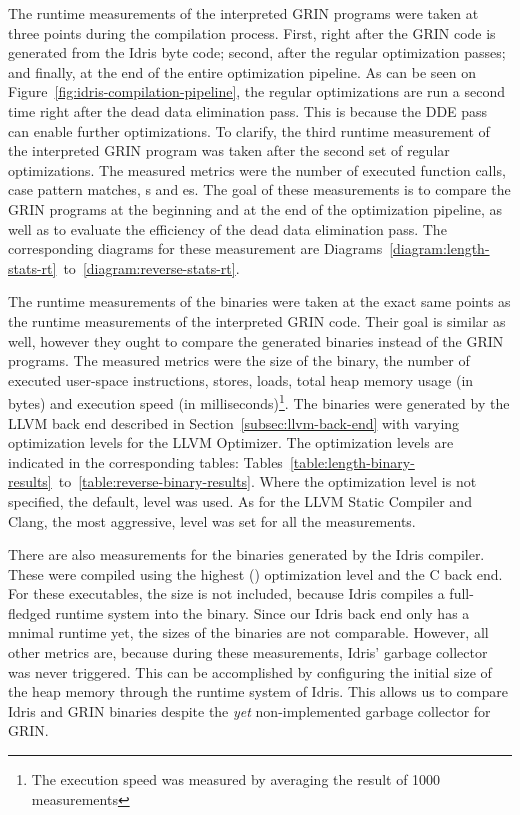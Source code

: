 \documentclass[main.tex]{subfiles}
\begin{document}
	The runtime measurements of the interpreted GRIN programs were taken at three points during the compilation process. First, right after the GRIN code is generated from the Idris byte code; second, after the regular optimization passes; and finally, at the end of the entire optimization pipeline. As can be seen on Figure~\ref{fig:idris-compilation-pipeline}, the regular optimizations are run a second time right after the dead data elimination pass. This is because the DDE pass can enable further optimizations. To clarify, the third runtime measurement of the interpreted GRIN program was taken after the second set of regular optimizations. The measured metrics were the number of executed function calls, case pattern matches, s and es. The goal of these measurements is to compare the GRIN programs at the beginning and at the end of the optimization pipeline, as well as to evaluate the efficiency of the dead data elimination pass. The corresponding diagrams for these measurement are Diagrams~\ref{diagram:length-stats-rt}~to~\ref{diagram:reverse-stats-rt}.


	The runtime measurements of the binaries were taken at the exact same points as the runtime measurements of the interpreted GRIN code. Their goal is similar as well, however they ought to compare the generated binaries instead of the GRIN programs. The measured metrics were the size of the binary, the number of executed user-space instructions, stores, loads, total heap memory usage (in bytes) and execution speed (in milliseconds)\footnote{The execution speed was measured by averaging the result of 1000 measurements}. The binaries were generated by the LLVM back end described in Section~\ref{subsec:llvm-back-end} with varying optimization levels for the LLVM Optimizer. The optimization levels are indicated in the corresponding tables: Tables~\ref{table:length-binary-results}~to~\ref{table:reverse-binary-results}. Where the optimization level is not specified, the default,  level was used. As for the LLVM Static Compiler and Clang, the most aggressive,  level was set for all the measurements.
	
	There are also measurements for the binaries generated by the Idris compiler. These were compiled using the highest () optimization level and the C back end. For these executables, the size is not included, because Idris compiles a full-fledged runtime system into the binary. Since our Idris back end only has a mnimal runtime yet, the sizes of the binaries are not comparable. However, all other metrics are, because during these measurements, Idris' garbage collector was never triggered. This can be accomplished by configuring the initial size of the heap memory through the runtime system of Idris. This allows us to compare Idris and GRIN binaries despite the \emph{yet} non-implemented garbage collector for GRIN.
	
\end{document}

